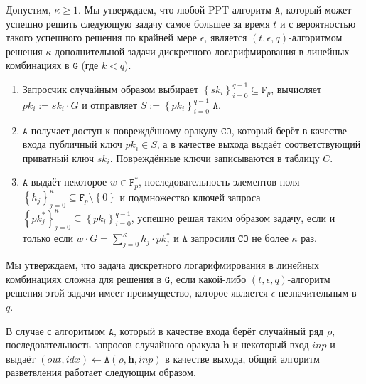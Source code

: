 \documentclass{llncs}
\newcommand{\A}{\texttt{A}}
\newcommand{\F}{\texttt{F}_p}
\newcommand{\G}{\texttt{G}}
\begin{document}
\begin{definition}\label{def:komdl}

Допустим, $\kappa \geq 1$. Мы утверждаем, что любой PPT-алгоритм $\A$, который может успешно решить следующую задачу самое большее за время $t$ и с вероятностью такого успешного решения по крайней мере $\epsilon$, является $(t, \epsilon, q)$-алгоритмом решения $\kappa$-дополнительной задачи дискретного логарифмирования в линейных комбинациях в $\G$ (где $k < q$).
\begin{enumerate}
\item Запросчик случайным образом выбирает $\left\{sk_i\right\}_{i=0}^{q-1} \subseteq \F$, вычисляет $pk_i := sk_i \cdot G$ и отправляет $S := \left\{pk_i\right\}_{i=0}^{q-1}$ $\A$.

\item $\A$ получает доступ к повреждённому оракулу $\texttt{CO}$, который берёт в качестве входа публичный ключ $pk_i \in S$, а в качестве выхода выдаёт соответствующий приватный ключ $sk_i$. Повреждённые ключи записываются в таблицу $C$.

\item $\A$ выдаёт некоторое $w \in \F^*$, последовательность элементов поля \linebreak $\left\{h_j\right\}_{j=0}^{\kappa} \subseteq \F \setminus \left\{0\right\}$ и подмножество ключей запроса $\left\{pk^*_j\right\}_{j=0}^{\kappa} \subseteq \left\{pk_i\right\}_{i=0}^{q-1}$, успешно решая таким образом задачу, если и только если $w \cdot G = \sum_{j=0}^{\kappa} h_j \cdot pk^*_j$ и $\A$ запросили $\texttt{CO}$ не более $\kappa$ раз.

\end{enumerate}
Мы утверждаем, что задача дискретного логарифмирования в линейных комбинациях сложна для решения в $\G$, если какой-либо $(t, \epsilon, q)$-алгоритм решения этой задачи имеет преимущество, которое является $\epsilon$ незначительным в $q$.
\end{definition}

В случае с алгоритмом $\A$, который в качестве входа берёт случайный ряд $\rho$, последовательность запросов случайного оракула $\textbf{h}$ и некоторый вход $inp$ и выдаёт $(out, idx) \leftarrow \A(\rho, \textbf{h}, inp)$ в качестве выхода, общий алгоритм разветвления работает следующим образом.
\end{document}
